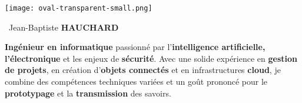 \documentclass[11pt, a4paper]{article}
\newcommand{\headleft}[1]{\vspace*{1.5ex}\textsc{\textbf{#1}}\par%
    \vspace*{-1ex}\hrulefill\par\vspace*{0.7ex}}
\begin{document}
\setlength{\topskip}{0pt}
\setlength{\parindent}{0pt}
\setlength{\parskip}{0pt}
\setlength{\fboxsep}{0pt}
\pagestyle{empty}
\raggedbottom

\begin{minipage}[t]{0.4\textwidth} %
\colorbox{bandeau}{\begin{minipage}[t][5.5mm][t]{\textwidth}\null\hfill\null\end{minipage}}

\vspace{-0.4ex} 			%
\colorbox{bandeau!100}{\color{white}  %
\textwidth\relax%
\begin{minipage}[t][293mm][t]{0.82\textwidth}


\vspace*{2.ex}	%
\null\hfill\texttt{[image: oval-transparent-small.png]}\hfill\null
\vspace*{6ex} 			%

{\BNP\Huge\ Jean-Baptiste \textbf{\textsc{HAUCHARD}} \normalsize}
\vspace*{0.5ex}			%

\Large
\headleft{\BNP }
\large\textbf{Ingénieur en \mbox{informatique}} \mbox{passionné} par l'\textbf{intelligence \mbox{artificielle}, l'électronique} et les enjeux de \textbf{\mbox sécurité}. Avec une solide \mbox{expérience} en \textbf{\mbox{gestion} de \mbox{projets}}, en \mbox{création} d'\textbf{objets \mbox{connectés}} et en \mbox{infrastructures} \textbf{cloud}, je \mbox{combine} des \mbox{compétences} techniques \mbox{variées} et un goût \mbox{prononcé} pour le \textbf{\mbox prototypage} et la \textbf{\mbox transmission} des savoirs.
\normalsize
\vspace*{15.5ex} 			%


\end{minipage}}
\end{minipage}
\end{document}
